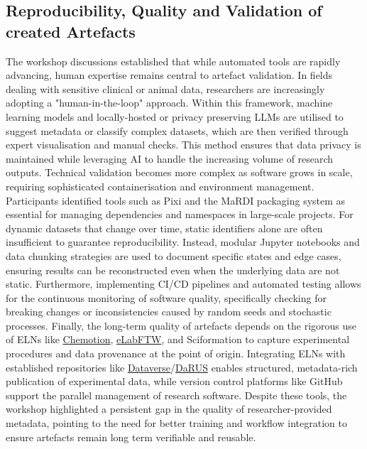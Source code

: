 \documentclass{eceasst}
\newcommand{\elabftw}{\href{https://www.elabftw.net/}{eLabFTW}}
\begin{document}
\subsection{Reproducibility, Quality and Validation of created Artefacts}
The workshop discussions established that while automated tools are rapidly advancing, human expertise remains central to artefact validation.
In fields dealing with sensitive clinical or animal data, researchers are increasingly adopting a "human-in-the-loop" approach.
Within this framework, machine learning models and locally-hosted or privacy preserving LLMs are utilised to suggest metadata or classify complex datasets, which are then verified through expert visualisation and manual checks.
This method ensures that data privacy is maintained while leveraging AI to handle the increasing volume of research outputs.
Technical validation becomes more complex as software grows in scale, requiring sophisticated containerisation and environment management.
Participants identified tools such as Pixi and the MaRDI packaging system as essential for managing dependencies and namespaces in large-scale projects.
For dynamic datasets that change over time, static identifiers alone are often insufficient to guarantee reproducibility.
Instead, modular Jupyter notebooks and data chunking strategies are used to document specific states and edge cases, ensuring results can be reconstructed even when the underlying data are not static.
Furthermore, implementing CI/CD pipelines and automated testing allows for the continuous monitoring of software quality, specifically checking for breaking changes or inconsistencies caused by random seeds and stochastic processes.
Finally, the long-term quality of artefacts depends on the rigorous use of ELNs like \href{https://chemotion.net/}{Chemotion}, \elabftw, and Sciformation to capture  experimental procedures and data provenance at the point of origin.
Integrating ELNs with established repositories like \href{https://dataverse.org/}{Dataverse}/\href{https://darus.uni-stuttgart.de/dataverse/darus}{DaRUS} enables structured, metadata-rich publication of experimental data, while version control platforms like GitHub support the parallel management of research software.
Despite these tools, the workshop highlighted a persistent gap in the quality of researcher-provided metadata, pointing to the need for better training and workflow integration to ensure artefacts remain long term verifiable and reusable.
\vspace{-1em}
\end{document}
